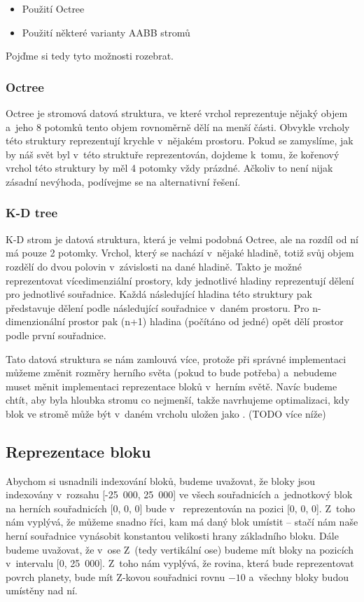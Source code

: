 \begin{itemize}
	\item Použití Octree
	\item Použití některé varianty AABB stromů
\end{itemize}

Pojďme si tedy tyto možnosti rozebrat.

\subsubsection{Octree}
Octree je stromová datová struktura, ve které vrchol reprezentuje nějaký objem a~jeho 8 potomků tento objem rovnoměrně dělí na menší části. Obvykle vrcholy této struktury reprezentují krychle v~nějakém prostoru. Pokud se zamyslíme, jak by náš svět byl v~této struktuře reprezentován, dojdeme k~tomu, že kořenový vrchol této struktury by měl 4 potomky vždy prázdné. Ačkoliv to není nijak zásadní nevýhoda, podívejme se na alternativní řešení.

\subsubsection{K-D tree}
K-D strom je datová struktura, která je velmi podobná Octree, ale na rozdíl od ní má pouze 2 potomky. Vrchol, který se nachází v~nějaké hladině, totiž svůj objem rozdělí do dvou polovin v~závislosti na dané hladině. Takto je možné reprezentovat vícedimenziální prostory, kdy jednotlivé hladiny reprezentují dělení pro jednotlivé souřadnice. Každá následující hladina této struktury pak představuje dělení podle následující souřadnice v~daném prostoru. Pro n-dimenzionální prostor pak (n+1) hladina (počítáno od jedné) opět dělí prostor podle první souřadnice.

Tato datová struktura se nám zamlouvá více, protože při správné implementaci můžeme  změnit rozměry herního světa (pokud to bude potřeba) a~nebudeme muset měnit implementaci reprezentace bloků v~herním světě. Navíc budeme chtít, aby byla hloubka stromu co nejmenší, takže navrhujeme optimalizaci, kdy blok ve stromě může být v~daném vrcholu uložen jako . (TODO více níže)

\subsection{Reprezentace bloku}

Abychom si usnadnili indexování bloků, budeme uvažovat, že bloky jsou indexovány v~rozsahu [-25~000, 25~000] ve všech souřadnicích a~jednotkový blok na herních souřadnicích [0, 0, 0] bude v~\UEu{} reprezentován na pozici [0, 0, 0]. Z~toho nám vyplývá, že můžeme snadno \UEu{} říci, kam má daný blok umístit -- stačí nám naše herní souřadnice vynásobit konstantou velikosti hrany základního bloku. Dále budeme uvažovat, že v~ose Z~(tedy vertikální ose) budeme mít bloky na pozicích v~intervalu [0, 25~000]. Z~toho nám vyplývá, že rovina, která bude reprezentovat povrch planety, bude mít Z-kovou souřadnici rovnu $-10$ a~všechny bloky budou umístěny nad ní.

